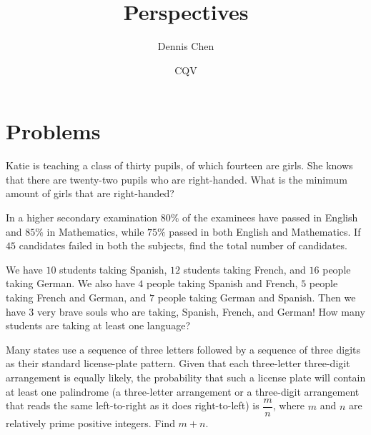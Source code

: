 \documentclass[mast]{lucky}
\title{Perspectives}
\author{Dennis Chen}
\date{CQV}
\begin{document}
\maketitle



\pagebreak

\section{Problems}



     \begin{prob}[]{2}
Katie is teaching a class of thirty pupils, of which fourteen are girls. She knows that there are twenty-two pupils who are right-handed. What is the minimum amount of girls that are right-handed?
\end{prob}
    
     \begin{prob}[]{2}
In a higher secondary examination $80\%$ of the examinees have passed in English and $85\%$ in Mathematics, while $75\%$ passed in both English and Mathematics. If $45$ candidates failed in both the subjects, find the total number of candidates.
\end{prob}

     \begin{prob}[]{2}
We have $10$ students taking Spanish, $12$ students taking French, and $16$ people taking German. We also have $4$ people taking Spanish and French, $5$ people taking French and German, and $7$ people taking German and Spanish. Then we have $3$ very brave souls who are taking, Spanish, French, and German! How many students are taking at least one language?
\end{prob}
    
     \begin{prob}[AIME I 2002/1]{2}
Many states use a sequence of three letters followed by a sequence of three digits as their standard license-plate pattern. Given that each three-letter three-digit arrangement is equally likely, the probability that such a license plate will contain at least one palindrome (a three-letter arrangement or a three-digit arrangement that reads the same left-to-right as it does right-to-left) is $\dfrac{m}{n}$, where $m$ and $n$ are relatively prime positive integers. Find $m+n.$
\end{prob}
\end{document}
